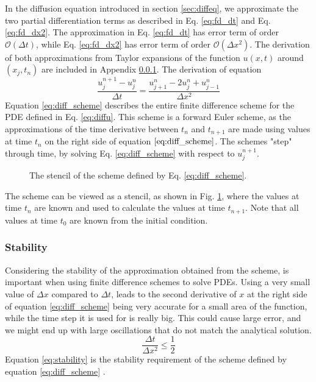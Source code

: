 In the diffusion equation introduced in section \ref{sec:diffeq}, we approximate the two partial differentiation terms as described in Eq. \ref{eq:fd_dt} and Eq. \ref{eq:fd_dx2}.
The approximation in Eq. \ref{eq:fd_dt} has error term of order $\mathcal{O}(\Delta t)$, while Eq. \ref{eq:fd_dx2} has error term of order $\mathcal{O}(\Delta x^2)$.
The derivation of both approximations from Taylor expansions of the function $u(x, t)$ around $(x_j, t_n)$ are included in Appendix \ref{}.
The derivation of equation 
\begin{equation}
    \label{eq:diff_scheme}
    \frac{u_j^{n+1}-u_j^n}{\Delta t} = \frac{u_{j+1}^n - 2u_j^n + u_{j-1}^n}{\Delta x^2}
\end{equation}
Equation \ref{eq:diff_scheme} describes the entire finite difference scheme for the PDE defined in Eq. \ref{eq:diffu}.
This scheme is a forward Euler scheme, as the approximations of the time derivative between $t_n$ and $t_{n+1}$ are made using values at time $t_n$ on the right side of equation $\ref{eq:diff_scheme}$.
The schemes "step" through time, by solving Eq. \ref{eq:diff_scheme} with respect to $u_j^{n+1}$.
\begin{figure}[h]
        \centering
        
        \caption{The stencil of the scheme defined by Eq. \ref{eq:diff_scheme}.} 
        \label{fig:fd_stencil}  
    \end{figure}
The scheme can be viewed as a stencil, as shown in Fig. \ref{fig:fd_stencil}, where the values at time $t_n$ are known and used to calculate the values at time $t_{n+1}$.
Note that all values at time $t_0$ are known from the initial condition.
\subsubsection{Stability}
Considering the stability of the approximation obtained from the scheme, is important when using finite difference schemes to solve PDEs.
Using a very small value of $\Delta x$ compared to $\Delta t$, leads to the second derivative of $x$ at the right side of equation \eqref{eq:diff_scheme} being very accurate for a small area of the function, while the time step it is used for is really big.
This could cause large error, and we might end up with large oscillations that do not match the analytical solution.
\begin{equation}
    \label{eq:stability}
    \frac{\Delta t}{\Delta x^2} \leq \frac{1}{2}
\end{equation}
Equation \eqref{eq:stability} is the stability requirement of the scheme defined by equation \eqref{eq:diff_scheme} \citep[p. 130]{tveitoPDE}.
